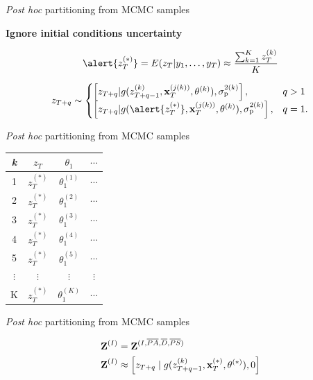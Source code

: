 \documentclass[12pt, compress, aspectratio=1610]{beamer}
\begin{document}
\begin{frame}{%
\protect\hypertarget{partitioning-from-mcmc-samples}{%
\emph{Post hoc} partitioning from MCMC samples}}

\bf{Ignore initial conditions uncertainty}

\begin{equation*}
\alert{z_{T}^{(\ast)}} = E(z_{T} | y_1,\dots,y_T) \approx \frac{\sum^K_{k=1} z_{T}^{(k)}}{K}
\end{equation*}

\begin{equation*}
    z_{T+q} \sim 
\begin{cases}
    \left[z_{T+q} | g(z_{T+q-1}^{(k)}, \textbf{x}_T^{(j(k))}, \boldmath{\theta}^{(k)}), \sigma^{2(k)}_{\text{p}} \right], &q>1 \\
    \left[z_{T+q} | g(\alert{z_{T}^{(\ast)}}, \textbf{x}_T^{(j(k))}, \boldmath{\theta}^{(k)}), \sigma^{2(k)}_{\text{p}} \right], &q=1.
\end{cases}
\end{equation*}

\end{frame}

\begin{frame}{%
\protect\hypertarget{partitioning-from-mcmc-samples-1}{%
\emph{Post hoc} partitioning from MCMC samples}}

\begin{longtable}[]{@{}cccc@{}}
\toprule
\emph{k} & \(z_T\) & \(\theta_1\) & \(\cdots\)\tabularnewline
\midrule
\endhead
1 & \(z_{T}^{(\ast)}\) & \(\theta_1^{(1)}\) & \(\cdots\)\tabularnewline
2 & \(z_{T}^{(\ast)}\) & \(\theta_1^{(2)}\) & \(\cdots\)\tabularnewline
3 & \(z_{T}^{(\ast)}\) & \(\theta_1^{(3)}\) & \(\cdots\)\tabularnewline
4 & \(z_{T}^{(\ast)}\) & \(\theta_1^{(4)}\) & \(\cdots\)\tabularnewline
5 & \(z_{T}^{(\ast)}\) & \(\theta_1^{(5)}\) & \(\cdots\)\tabularnewline
\(\vdots\) & \(\vdots\) & \(\vdots\) & \(\vdots\)\tabularnewline
K & \(z_{T}^{(\ast)}\) & \(\theta_1^{(K)}\) & \(\cdots\)\tabularnewline
\bottomrule
\end{longtable}

\end{frame}

\begin{frame}{%
\protect\hypertarget{partitioning-from-mcmc-samples-2}{%
\emph{Post hoc} partitioning from MCMC samples}}

\begin{align*}
\textbf{Z}^{(I)} &= \textbf{Z}^{(I,\overline{PA},\overline{D},\overline{PS})} \\
\textbf{Z}^{(I)} &\approx \left[z_{T+q} \; | \; g(z_{T+q-1}^{(k)}, \textbf{x}^{(\ast)}_T, \boldmath{\theta}^{(\ast)}), 0 \right] \\
\end{align*}

\end{frame}
\end{document}
